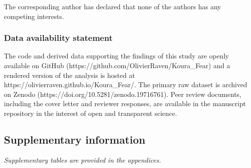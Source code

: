 \documentclass[
  letterpaper,
  DIV=11,
  numbers=noendperiod]{scrartcl}
\newcounter{none} %
\begin{document}
The corresponding author has declared that none of the authors has any
competing interests.

\subsubsection{Data availability
statement}\label{data-availability-statement}

The code and derived data supporting the findings of this study are
openly available on GitHub (https://github.com/OlivierRaven/Koura\_Fear)
and a rendered version of the analysis is hosted at
https://olivierraven.github.io/Koura\_Fear/. The primary raw dataset is
archived on Zenodo (https://doi.org/10.5281/zenodo.19716761). Peer
review documents, including the cover letter and reviewer responses, are
available in the manuscript repository in the interest of open and
transparent science.

\subsection{Supplementary information}\label{supplementary-information}

\emph{Supplementary tables are provided in the appendices.}
\end{document}
